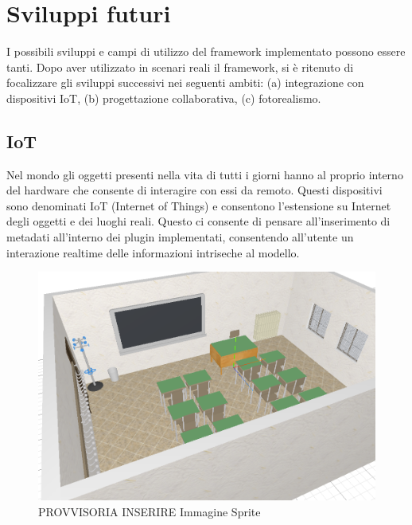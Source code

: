 \section{Sviluppi futuri}
\label{sec:conclusions_section_2}

I possibili sviluppi e campi di utilizzo del framework implementato possono essere tanti.
Dopo aver utilizzato in scenari reali il framework, si è ritenuto di focalizzare gli sviluppi successivi nei seguenti ambiti:
(a) integrazione con dispositivi IoT, (b) progettazione collaborativa, (c) fotorealismo.

\subsection{IoT}
\label{sec:conclusions_section_2_sub_1}
Nel mondo gli oggetti presenti nella vita di tutti i giorni hanno al proprio interno del hardware che consente di interagire
con essi da remoto. Questi dispositivi sono denominati IoT (Internet of Things) e consentono l'estensione su Internet degli
oggetti e dei luoghi reali. Questo ci consente di pensare all'inserimento di metadati all'interno dei plugin implementati,
consentendo all'utente un interazione realtime delle informazioni intriseche al modello.\\

\begin{figure}[htbp] %
   \centering
   \includegraphics[width=1\linewidth]{images/3d-school-2}
   \caption{PROVVISORIA INSERIRE Immagine Sprite}
   \label{fig:revit}
   \end{figure}
\newpage

